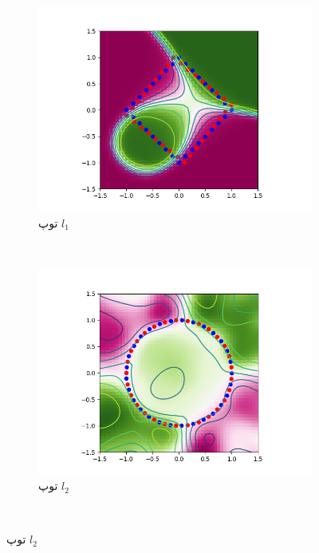 \documentclass[12pt,onecolumn,a4paper]{article}
\begin{document}
\begin{figure}
	\centering
	\begin{subfigure}[b]{0.3\textwidth}
		\includegraphics[width=\textwidth]{2d_even_l1.png}
		\caption{توپ $l_1$}
		\label{fig:evenball1}
	\end{subfigure}
	~ %
	\begin{subfigure}[b]{0.3\textwidth}
		\includegraphics[width=\textwidth]{2d_even_l2.png}
		\caption{توپ $l_2$}
		\label{fig:evenballinf}
	\end{subfigure}
	~ %

\end{figure}
\end{document}
